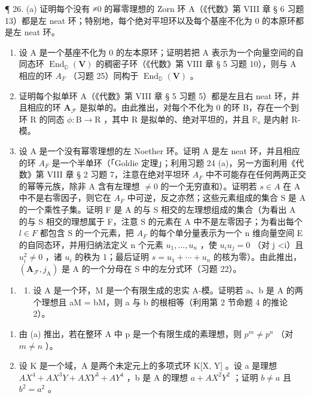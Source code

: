 ¶ 26. (a) 证明每个没有 ≠0 的幂零理想的 Zorn 环 A（《代数》第 VIII 章 § 6 习题 13）都是左 neat 环；特别地，每个绝对平坦环以及每个基座不化为 0 的本原环都是左 neat 环。

\begin{enumerate}
\def\labelenumi{(\alph{enumi})}
\setcounter{enumi}{1}
\item
  设 A 是一个基座不化为 0 的左本原环；证明若把 A 表示为一个向量空间的自同态环 \(\operatorname{End}_{\mathbb{D}}(\mathbf{V})\) 的稠密子环（《代数》第 VIII 章 § 5 习题 10），则与 A 相应的环 \(A_{F}\) （习题 25）同构于 \(\operatorname{End}_{\mathbb{D}}(\mathbf{V})\) 。
\item
  证明每个拟单环 A（《代数》第 VIII 章 § 5 习题 5）都是左且右 neat 环，并且相应的环 \(\mathbf{A}_{\mathcal{F}}\) 是拟单的。由此推出，对每个不化为 0 的环 B，存在一个到环 R 的同态 \(\phi: \mathrm{B} \to \mathrm{R}\) ，其中 R 是拟单的、绝对平坦的，并且 \(\mathbb{R}_s\) 是内射 R-模。
\item
  设 A 是一个没有幂零理想的左 Noether 环。证明 A 是左 neat 环，并且相应的环 \(A_{F}\) 是一个半单环（「Goldie 定理」；利用习题 24 (a)，另一方面利用《代数》第 VIII 章 § 2 习题 7，注意在绝对平坦环 \(A_{F}\) 中不可能存在任何两两正交的幂等元族，除非 A 含有左理想 \(\neq0\) 的一个无穷直和）。证明若 \(s\in A\) 在 A 中不是右零因子，则它在 \(A_{F}\) 中可逆，反之亦然；这些元素组成的集合 S 是 A 的一个乘性子集。证明 F 是 A 的与 S 相交的左理想组成的集合（为看出 A 的与 S 相交的理想属于 F，注意 S 的元素在 A 中不是左零因子；为看出每个 \(l\in F\) 都包含 S 的一个元素，把 \(A_{F}\) 的每个单分量表示为一个 n 维向量空间 E 的自同态环，并用归纳法定义 n 个元素 \(u_{1},\ldots,u_{n}\) ，使 \(u_{i}u_{j}=0\) （对 j \textless i）且 \(u_{i}^{2}\neq0\) ，诸 \(u_{i}\) 的秩为 1；最后证明 \(s=u_{1}+\cdots+u_{n}\) 的核为零）。由此推出，\((\mathbf{A}_{\mathcal{F}},j_{\mathrm{A}})\) 是 A 的一个分母在 S 中的左分式环（习题 22）。
\end{enumerate}

\begin{enumerate}
\def\labelenumi{\arabic{enumi}.}
\setcounter{enumi}{26}
\tightlist
\item
  \begin{enumerate}
  \def\labelenumii{(\alph{enumii})}
  \tightlist
  \item
    设 A 是一个环，M 是一个有限生成的忠实 A-模。证明若 a、b 是 A 的两个理想且 aM = bM，则 a 与 b 的根相等（利用第 2 节命题 4 的推论 2）。
  \end{enumerate}
\end{enumerate}

\begin{enumerate}
\def\labelenumi{(\alph{enumi})}
\setcounter{enumi}{1}
\item
  由 (a) 推出，若在整环 A 中 p 是一个有限生成的素理想，则 \(p^{m} \neq p^{n}\) （对 \(m \neq n\) ）。
\item
  设 K 是一个域，A 是两个未定元上的多项式环 K{[}X, Y{]} 。设 a 是理想 \(AX^{4} + AX^{3}Y + AXY^{3} + AY^{4}\) ，b 是 A 的理想 \(a + AX^{2}Y^{2}\) ；证明 \(b \neq a\) 且 \(b^{2} = a^{2}\) 。
\end{enumerate}
